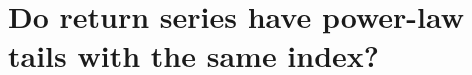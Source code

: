\chapter[Do return series have power-law tails with the same
  index?]{{\huge Do return series have power-law tails with the same
    index?}}
\label{ch:TailParameters}

